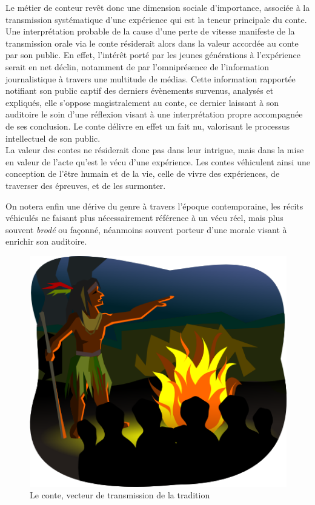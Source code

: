 Le métier de conteur revêt donc une dimension sociale d'importance, associée à la transmission systématique d'une expérience qui est la teneur principale du conte. Une interprétation probable de la cause d'une perte de vitesse manifeste de la transmission orale via le conte résiderait alors dans la valeur accordée au conte par son public. En effet, l'intérêt porté par les jeunes générations à l'expérience serait en net déclin, notamment de par l'omniprésence de l'information journalistique à travers une multitude de médias. Cette information rapportée notifiant son public captif des derniers évènements survenus, analysés et expliqués, elle s'oppose magistralement au conte, ce dernier laissant à son auditoire le soin d'une réflexion visant à une interprétation propre accompagnée de ses conclusion. Le conte délivre en effet un fait nu, valorisant le processus intellectuel de son public.\\

La valeur des contes ne résiderait donc pas dans leur intrigue, mais dans la mise en valeur de l'acte qu'est le vécu d'une expérience. Les contes véhiculent ainsi une conception de l'être humain et de la vie, celle de vivre des expériences, de traverser des épreuves, et de les surmonter.

On notera enfin une dérive du genre à travers l'époque contemporaine, les récits véhiculés ne faisant plus nécessairement référence à un vécu réel, mais plus souvent \textit{brodé} ou façonné, néanmoins souvent porteur d'une morale visant à enrichir son auditoire.\\

\begin{figure}[h!]
    \centering
    \includegraphics[width=0.80\linewidth]{img/storyteller.png}
    \caption{Le conte, vecteur de transmission de la tradition}
\end{figure}

